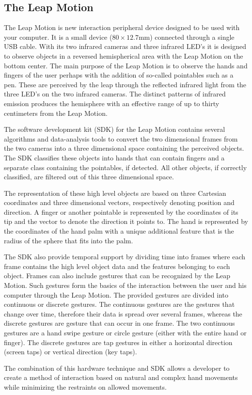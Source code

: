 \subsection{The Leap Motion}

The Leap Motion is new interaction peripheral device designed to be
used with your computer. It is a small device ($80\times12.7$mm)
connected through a single USB cable. With its two infrared
cameras and three infrared LED\textquoteright{}s it is designed to
observe objects in a reversed hemispherical area with the Leap Motion
on the bottom center. The main purpose of the Leap Motion is to observe
the hands and fingers of the user perhaps with the addition of so-called
pointables such as a pen. These are perceived by the leap through
the reflected infrared light from the three LED\textquoteright{}s
on the two infrared cameras. The distinct patterns of infrared emission
produces the hemisphere with an effective range of up to thirty centimeters
from the Leap Motion.

The software development kit (SDK) for the Leap Motion contains several
algorithms and data-analysis tools to convert the two dimensional
frames from the two cameras into a three dimensional space containing
the perceived objects. The SDK classifies these objects into hands
that can contain fingers and a separate class containing the pointables,
if detected. All other objects, if correctly classified, are filtered
out of this three dimensional space.

The representation of these high level objects are based on three
Cartesian coordinates and three dimensional vectors, respectively
denoting position and direction. A finger or another pointable is
represented by the coordinates of its tip and the vector to denote
the direction it points to. The hand is represented by the coordinates
of the hand palm with a unique additional feature that is the radius
of the sphere that fits into the palm.

The SDK also provide temporal support by dividing time into frames
where each frame contains the high level object data and the features
belonging to each object. Frames can also include gestures that can
be recognized by the Leap Motion. Such gestures form the basics of
the interaction between the user and his computer through the Leap
Motion. The provided gestures are divided into continuous or discrete
gestures. The continuous gestures are the gestures that change over
time, therefore their data is spread over several frames, whereas
the discrete gestures are gesture that can occur in one frame. The
two continuous gestures are a hand swipe gesture or circle gesture
(either with the entire hand or finger). The discrete gestures are
tap gestures in either a horizontal direction (screen taps) or vertical
direction (key taps).

The combination of this hardware technique and SDK allows a developer
to create a method of interaction based on natural and complex hand
movements while minimizing the restraints on allowed movements. 
